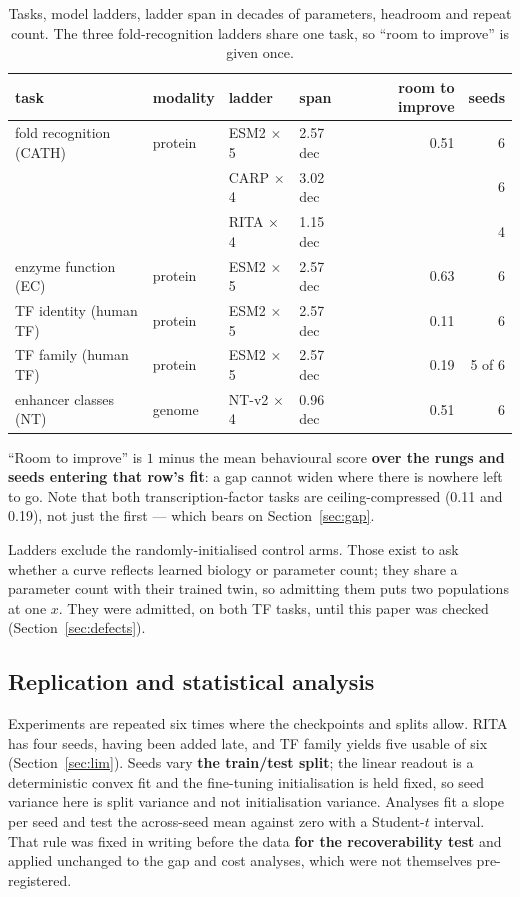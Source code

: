 \documentclass[11pt]{article}
\begin{document}
\begin{table}[h]
\centering
\small
\begin{tabular}{@{}llllrr@{}}
\toprule
\textbf{task} & \textbf{modality} & \textbf{ladder} & \textbf{span} &
\textbf{room to improve} & \textbf{seeds} \\
\midrule
fold recognition (CATH) & protein & ESM2 $\times$5 & 2.57 dec & 0.51 & 6 \\
 & & CARP $\times$4 & 3.02 dec & & 6 \\
 & & RITA $\times$4 & 1.15 dec & & 4 \\
enzyme function (EC) & protein & ESM2 $\times$5 & 2.57 dec & 0.63 & 6 \\
TF identity (human TF) & protein & ESM2 $\times$5 & 2.57 dec & 0.11 & 6 \\
TF family (human TF) & protein & ESM2 $\times$5 & 2.57 dec & 0.19 & 5 of 6 \\
enhancer classes (NT) & genome & NT-v2 $\times$4 & 0.96 dec & 0.51 & 6 \\
\bottomrule
\end{tabular}
\caption{Tasks, model ladders, ladder span in decades of parameters, headroom
and repeat count. The three fold-recognition ladders share one task, so ``room
to improve'' is given once.}
\label{tab:tasks}
\end{table}

``Room to improve'' is $1$ minus the mean behavioural score \textbf{over the rungs
and seeds entering that row's fit}: a gap cannot widen where there is nowhere left
to go. Note that both transcription-factor tasks are ceiling-compressed (0.11 and
0.19), not just the first --- which bears on Section~\ref{sec:gap}.

Ladders exclude the randomly-initialised control arms. Those exist to ask whether
a curve reflects learned biology or parameter count; they share a parameter count
with their trained twin, so admitting them puts two populations at one $x$. They
were admitted, on both TF tasks, until this paper was checked
(Section~\ref{sec:defects}).

\subsection{Replication and statistical analysis}

Experiments are repeated six times where the checkpoints and splits allow.
RITA has four seeds, having been added late, and TF family yields five usable
of six (Section~\ref{sec:lim}). Seeds vary \textbf{the train/test split};
the linear readout is a deterministic convex fit and the fine-tuning
initialisation is held fixed, so seed variance here is split variance and not
initialisation variance. Analyses fit a slope per seed and test the across-seed
mean against zero with a Student-$t$ interval. That rule was fixed in writing
before the data \textbf{for the recoverability test} and applied unchanged to the
gap and cost analyses, which were not themselves pre-registered.
\end{document}
